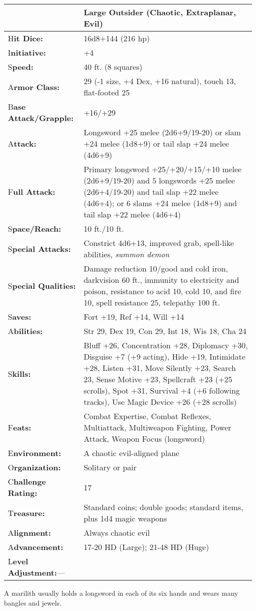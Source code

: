 \documentclass{article}
\begin{document}
\begin{tabular}{|>{\raggedright}p{90pt}|>{\raggedright}p{236pt}|}
\hline
  & Large Outsider (Chaotic, Extraplanar, Evil)\tabularnewline
\hline
H\textbf{it Dice:} & 16d8+144 (216 hp)\tabularnewline
\hline
I\textbf{nitiative:} & +4\tabularnewline
\hline
S\textbf{peed:} & 40 ft. (8 squares)\tabularnewline
\hline
A\textbf{rmor Class:} & 29 (-1 size, +4 Dex, +16 natural), touch 13, flat-footed 
25\tabularnewline
\hline
B\textbf{ase Attack/Grapple:} & +16/+29\tabularnewline
\hline
A\textbf{ttack:} & Longsword +25 melee (2d6+9/19-20) or slam +24 melee (1d8+9) 
or tail slap +24 melee (4d6+9)\tabularnewline
\hline
F\textbf{ull Attack:} & Primary longsword +25/+20/+15/+10 melee (2d6+9/19-20) and 
5 longswords +25 melee (2d6+4/19-20) and tail slap +22 melee (4d6+4); or 6 slams 
+24 melee (1d8+9) and tail slap +22 melee (4d6+4)\tabularnewline
\hline
S\textbf{pace/Reach:} & 10 ft./10 ft.\tabularnewline
\hline
S\textbf{pecial Attacks:} & Constrict 4d6+13, improved grab, spell-like abilities, 
\textit{summon demon}\tabularnewline
\hline
S\textbf{pecial Qualities:} & Damage reduction 10/good and cold iron, darkvision 
60 ft., immunity to electricity and poison, resistance to acid 10, cold 10, and 
fire 10, spell resistance 25, telepathy 100 ft.\tabularnewline
\hline
S\textbf{aves:} & Fort +19, Ref +14, Will +14\tabularnewline
\hline
A\textbf{bilities:} & Str 29, Dex 19, Con 29, Int 18, Wis 18, Cha 24\tabularnewline
\hline
S\textbf{kills:} & Bluff +26, Concentration +28, Diplomacy +30, Disguise +7 (+9 
acting), Hide +19, Intimidate +28, Listen +31, Move Silently +23, Search 23, Sense 
Motive +23, Spellcraft +23 (+25 scrolls), Spot +31, Survival +4 (+6 following tracks), 
Use Magic Device +26 (+28 scrolls)\tabularnewline
\hline
F\textbf{eats:} & Combat Expertise, Combat Reflexes, Multiattack, Multiweapon Fighting, 
Power Attack, Weapon Focus (longsword)\tabularnewline
\hline
E\textbf{nvironment:} & A chaotic evil-aligned plane\tabularnewline
\hline
O\textbf{rganization:} & Solitary or pair\tabularnewline
\hline
C\textbf{hallenge Rating:} & 17\tabularnewline
\hline
T\textbf{reasure:} & Standard coins; double goods; standard items, plus 1d4 magic 
weapons\tabularnewline
\hline
A\textbf{lignment:} & Always chaotic evil\tabularnewline
\hline
A\textbf{dvancement:} & 17-20 HD (Large); 21-48 HD (Huge)\tabularnewline
\hline
L\textbf{evel Adjustment:}--- & \tabularnewline
\hline
\end{tabular}

A marilith usually holds a longsword in each of its six hands and wears many bangles 
and jewels.
\end{document}
